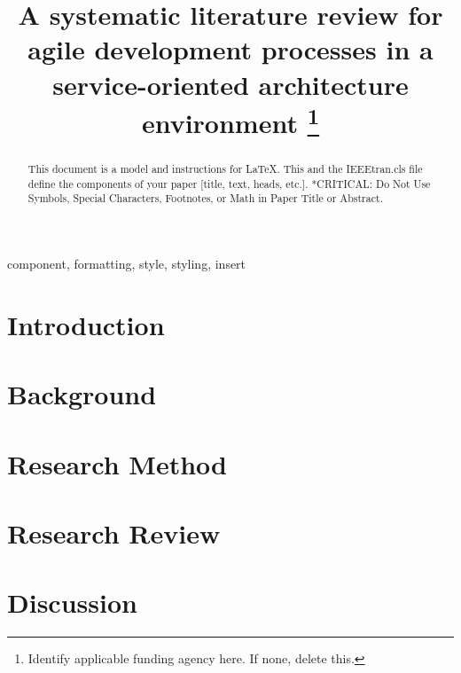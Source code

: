 \documentclass[conference]{IEEEtran}
\begin{document}
\title{A systematic literature review for agile development processes in a service-oriented architecture environment
\thanks{Identify applicable funding agency here. If none, delete this.}
}

\author{
\and
{}
}

\maketitle

\begin{abstract}
This document is a model and instructions for \LaTeX.
This and the IEEEtran.cls file define the components of your paper [title, text, heads, etc.]. *CRITICAL: Do Not Use Symbols, Special Characters, Footnotes, 
or Math in Paper Title or Abstract.
\end{abstract}

\begin{IEEEkeywords}
component, formatting, style, styling, insert
\end{IEEEkeywords}

\section{Introduction}
\label{sec:Introduction}


\section{Background}
\label{sec:Background}


\section{Research Method}
\label{sec:ResearchMethod}


\section{Research Review}
\label{sec:Review}


\section{Discussion}
\label{sec:Discussion}





{}
\end{document}
